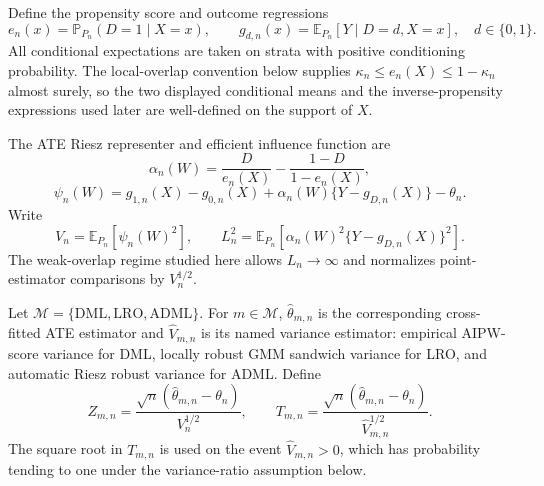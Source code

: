 \documentclass[11pt]{article}
\newcommand{\E}{\mathbb{E}}
\renewcommand{\Pr}{\mathbb{P}}
\theoremstyle{definition}
\theoremstyle{plain}
\theoremstyle{remark}
\begin{document}
Define the propensity score and outcome regressions
\[
  e_n(x)=\Pr_{P_n}(D=1\mid X=x),\qquad
  g_{d,n}(x)=\E_{P_n}[Y\mid D=d,X=x],\quad d\in\{0,1\}.
\]
All conditional expectations are taken on strata with positive conditioning
probability.  The local-overlap convention below supplies
\(\kappa_n\le e_n(X)\le1-\kappa_n\) almost surely, so the two displayed
conditional means and the inverse-propensity expressions used later are
well-defined on the support of \(X\).

The ATE Riesz representer and efficient influence function are
\[
  \alpha_n(W)=\frac{D}{e_n(X)}-\frac{1-D}{1-e_n(X)},
\]
\[
  \psi_n(W)=g_{1,n}(X)-g_{0,n}(X)
  +\alpha_n(W)\{Y-g_{D,n}(X)\}-\theta_n.
\]
Write
\[
  V_n=\E_{P_n}[\psi_n(W)^2],\qquad
  L_n^2=\E_{P_n}\!\left[\alpha_n(W)^2\{Y-g_{D,n}(X)\}^2\right].
\]
The weak-overlap regime studied here allows \(L_n\to\infty\) and
normalizes point-estimator comparisons by \(V_n^{1/2}\).

Let
\(\mathcal M=\{\mathrm{DML},\mathrm{LRO},\mathrm{ADML}\}\).  For
\(m\in\mathcal M\), \(\hat\theta_{m,n}\) is the corresponding cross-fitted ATE
estimator and \(\hat V_{m,n}\) is its named variance estimator: empirical
AIPW-score variance for DML, locally robust GMM sandwich variance for LRO, and
automatic Riesz robust variance for ADML.  Define
\[
  Z_{m,n}=\frac{\sqrt n(\hat\theta_{m,n}-\theta_n)}{V_n^{1/2}},
  \qquad
  T_{m,n}=\frac{\sqrt n(\hat\theta_{m,n}-\theta_n)}{\hat V_{m,n}^{1/2}}.
\]
The square root in \(T_{m,n}\) is used on the event \(\hat V_{m,n}>0\), which
has probability tending to one under the variance-ratio assumption below.
\end{document}

